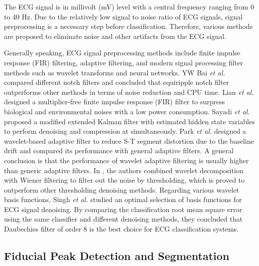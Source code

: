 The ECG signal is in millivolt (mV) level with a central frequency ranging from 0 to 40 Hz\cite{thakor1984estimation}. %
Due to the relatively low signal to noise ratio of ECG signals, signal preprocessing is a necessary step before classification. Therefore, various methods are proposed to eliminate noise and other artifacts from the ECG signal\cite{lian2004ecg,thakor1984estimation,bai2004adjustable,Sayadi,park1998application, nikolaev2000wavelet, denoise,poungponsri2013adaptive}.%

Generally speaking, ECG signal preprocessing methods include finite impulse response (FIR) filtering, adaptive filtering, and modern signal processing filter methods such as wavelet transforms and neural networks\cite{bai2004adjustable,Sayadi,denoise,poungponsri2013adaptive}. YW Bai \textit{et al.} compared different notch filters and concluded that equiripple notch filter outperforms other methods in terms of noise reduction and CPU time\cite{bai2004adjustable}. Lian \textit{et al.} \cite{lian2004ecg} designed a multiplier-free finite impulse response (FIR) filter to surpress biological and environmental noises with a low power consumption. Sayadi \textit{et al.} proposed a modified extended Kalman filter with estimated hidden state variables to perform denoising and compression at simultaneously\cite{Sayadi}. Park \textit{et al.} designed a wavelet-based adaptive filter to reduce S-T segment distortion due to the baseline drift and compared its performance with general adaptive filters\cite{park1998application}. A general conclusion is that the performance of wavelet adaptive filtering is usually higher than generic adaptive filters. In \cite{nikolaev2000wavelet}, the authors combined wavelet decomposition with Wiener filtering to filter out the noise by thresholding, which is proved to outperform other thresholding denoising methods. Regarding various wavelet basis functions, Singh \textit{et al.} studied an optimal selection of basis functions for ECG signal denoising\cite{denoise}. By comparing the classification root mean square error using the same classifier and different denoising methods, they concluded that Daubechies filter of order 8 is the best choice for ECG classification systems.


\subsection{Fiducial Peak Detection and Segmentation}\label{sec:fiducial_peaks}

